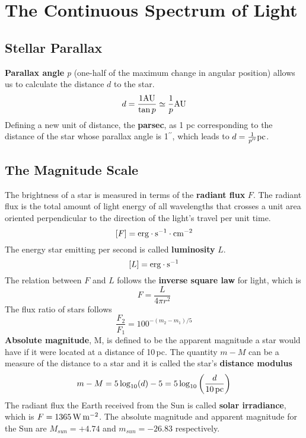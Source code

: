 \documentclass{article}
\numberwithin{equation}{section}
\numberwithin{figure}{section}
\begin{document}
\section{The Continuous Spectrum of Light}
	\subsection{Stellar Parallax}
	{\bf Parallax angle} {\it p} (one-half of the maximum change in angular position) allows us to calculate the distance $d$ to the star.
	\begin{equation}
		d = \frac{1 {\rm AU}}{\tan p} \simeq \frac{1}{p} {\rm AU}
	\end{equation}
	Defining a new unit of distance, the {\bf parsec}, as 1 pc corresponding to the distance of the star whose parallax angle is 1$^{\prime\prime}$, which leads to $d = \frac{1}{p^{\prime\prime}} {\rm pc}$.
	
	\subsection{The Magnitude Scale}
	The brightness of a star is measured in terms of the {\bf radiant flux} $F$. The radiant flux is the total amount of light energy of all wavelengths that crosses a unit area oriented perpendicular to the direction of the light's travel per unit time.
	$$[F] = {\rm erg}\cdot {\rm s}^{-1}\cdot {\rm cm}^{-2}$$
	The energy star emitting per second is called {\bf luminosity} $L$.
	$$[L] = {\rm erg}\cdot{\rm s}^{-1}$$
	The relation between $F$ and $L$ follows the {\bf inverse square law} for light, which is
	\begin{equation}
		F = \frac{L}{4\pi r^2}
	\end{equation}
	The flux ratio of stars follows
	\begin{equation}
		\frac{F_2}{F_1} = 100^{-(m_2-m_1)/5}
	\end{equation}
	{\bf Absolute magnitude}, M, is defined to be the apparent magnitude a star would have if it were located at a distance of 10\,pc. The quantity $m-M$ can be a measure of the distance to a star and it is called the star's {\bf distance modulus}
	\begin{equation}
		m - M = 5\log_{10}(d) - 5 = 5\log_{10}\left(\frac{d}{10\,{\rm pc}}\right)
	\end{equation}
	The radiant flux the Earth received from the Sun is called {\bf solar irradiance}, which is $F = 1365\,{\rm W}\,{\rm m}^{-2}$. The absolute magnitude and apparent magnitude for the Sun are $M_{sun}=+4.74$ and $m_{sun}=-26.83$ respectively.
	
\end{document}
